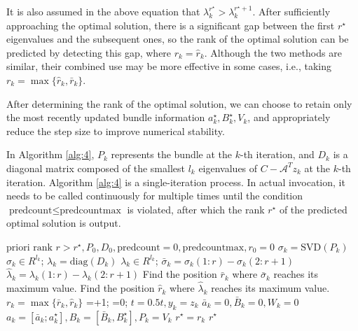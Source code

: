 \documentclass{jcmlatex}
\begin{document}
It is also assumed in the above equation that \(\lambda_{k}^{r^{\star}} > \lambda_{k}^{r^{\star}+1}\). After sufficiently approaching the optimal solution, there is a significant gap between the first \(r^{\star}\) eigenvalues and the subsequent ones, so the rank of the optimal solution can be predicted by detecting this gap, where \(r_{k} = \hat{r}_{k}\). Although the two methods are similar, their combined use may be more effective in some cases, i.e., taking \(r_{k} = \max\{\hat{r}_{k}, \bar{r}_{k}\}\).

After determining the rank of the optimal solution, we can choose to retain only the most recently updated bundle information \(a_{k}^{\star}, B_{k}^{\star}, V_{k}\), and appropriately reduce the step size to improve numerical stability.

In Algorithm \ref{alg:4}, \( P_k \) represents the bundle at the \( k \)-th iteration, and \( D_k \) is a diagonal matrix composed of the smallest \( l_k \) eigenvalues of \(C-\mathcal{A}^T z_k\) at the \( k \)-th iteration. Algorithm \ref{alg:4} is a single-iteration process. In actual invocation, it needs to be called continuously for multiple times until the condition \(\text{predcount}\leq \text{predcountmax}\) is violated, after which the rank \(r^{\star}\) of the predicted optimal solution is output.  
\begin{algorithm}
\caption{Single Iteration Rank Prediction}\label{alg:4}
\begin{algorithmic}[1]
    \Require $\text{priori rank } r > r^{\star},P_{0},D_{0},\text{predcount}=0,\text{predcountmax},r_{0}=0 $
        \State \(\sigma_{k}=\text{SVD}(P_{k})\)  \(\sigma_{k}\in R^{l_{k}}\);
        \State \(\lambda_{k}=\text{diag}(D_{k})\)  \(\lambda_{k}\in R^{l_{k}}\);
        \State \(\bar{\sigma}_{k}=\sigma_{k}(1:r)-\sigma_{k}(2:r+1)\)
        \State \(\hat{\lambda}_{k}=\lambda_{k}(1:r)-\lambda_{k}(2:r+1)\)
        \State Find the position \( \bar{r}_{k} \) where \( \bar{\sigma}_{k} \) reaches its maximum value.
        \State Find the position \( \hat{r}_{k} \) where \( \hat{\lambda}_{k} \) reaches its maximum value.
        \State \(r_{k}=\max\{\bar{r}_{k},\hat{r}_{k}\}\)
            \State {}=+1;
        \Else
            \State {}=0;
        \EndIf
    \Else
        \State \(t=0.5t,y_{k}=z_{k}\)
        \State \(\bar{a}_{k}=0,\bar{B}_{k}=0,W_{k}=0\)
        \State \(a_{k}=[\bar{a}_{k};a_{k}^{\star}],B_{k}=[\bar{B}_{k},B_{k}^{\star}],P_{k}=V_{k}\)
        \State \(r^{\star}=r_{k}\)
    \EndIf
    \State \Return \(r^{\star}\)
\end{algorithmic}
\end{algorithm}
\end{document}
